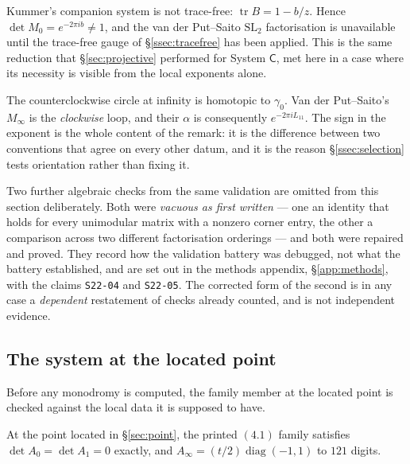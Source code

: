 \begin{remark}
Kummer's companion system is not trace-free: $\operatorname{tr}B=1-b/z$. Hence
$\det M_0=e^{-2\pi i b}\neq 1$, and the van der Put--Saito $\mathrm{SL}_2$
factorisation is unavailable until the trace-free gauge of
\S\ref{ssec:tracefree} has been applied. This is the same reduction that
\S\ref{sec:projective} performed for System $\mathsf C$, met here in a case
where its necessity is visible from the local exponents alone.
\end{remark}

\begin{remark}
The counterclockwise circle at infinity is homotopic to $\gamma_0$. Van der
Put--Saito's $M_\infty$ is the \emph{clockwise} loop, and their $\alpha$ is
consequently $e^{-2\pi i L_{11}}$. The sign in the exponent is the whole
content of the remark: it is the difference between two conventions that agree
on every other datum, and it is the reason \S\ref{ssec:selection} tests
orientation rather than fixing it.
\end{remark}

Two further algebraic checks from the same validation are omitted from this
section deliberately. Both were \emph{vacuous as first written} --- one an
identity that holds for every unimodular matrix with a nonzero corner entry,
the other a comparison across two different factorisation orderings --- and
both were repaired and proved. They record how the validation battery was
debugged, not what the battery established, and are set out in the methods
appendix, \S\ref{app:methods}, with the claims \texttt{S22-04} and
\texttt{S22-05}. The corrected form of the second is in any case a
\emph{dependent} restatement of checks already counted, and is not independent
evidence.

\subsection{The system at the located point}\label{ssec:atpoint}

Before any monodromy is computed, the family member at the located point is
checked against the local data it is supposed to have.

\begin{remark}
At the point located in \S\ref{sec:point}, the printed $(4.1)$ family satisfies
$\det A_0=\det A_1=0$ exactly, and $A_\infty=(t/2)\operatorname{diag}(-1,1)$ to
$121$ digits.
\end{remark}

